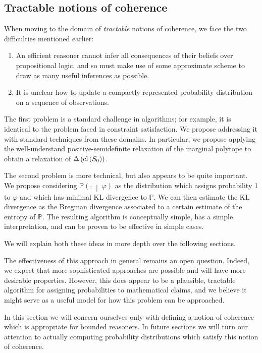\documentclass[12pt]{article}
\theoremstyle{definition}
\newcommand{\ofc}[2]{\left(#1\;\middle\vert\;#2\right)}
\newcommand{\PP}{\mathbb{P}}
\newcommand{\Pc}[2]{\PP\ofc{#1}{#2}}
\newcommand{\vp}{\varphi}
\begin{document}
\subsection{Tractable notions of coherence}

When moving to the domain of \emph{tractable} notions of coherence,
we face the two difficulties mentioned earlier:
\begin{enumerate}
\item An efficient reasoner cannot infer all consequences
of their beliefs over propositional logic,
and so must make use of some approximate scheme
to draw as many useful inferences as possible.
\item It is unclear how to update a compactly represented
probability distribution on a sequence of observations.
\end{enumerate}
The first problem is a standard challenge in algorithms;
for example, it
is identical to the problem faced in constraint satisfaction.
We propose addressing it with standard techniques
from these domains.
In particular, we propose applying the well-understand
positive-semidefinite relaxation of the marginal polytope
to obtain a relaxation of $\Delta\left(\text{cl}\left(S_0\right)\right)$.

The second problem is more technical, but also appears
to be quite important.
We propose considering
$\Pc{\cdot}{\vp}$ as the distribution which assigns
probability 1 to $\vp$ and which has minimal KL divergence
to $\PP$.
We can then estimate the KL divergence as the Bregman divergence
associated to a certain estimate of the entropy of $\PP$.
The resulting algorithm is conceptually simple, has a simple interpretation,
and can be proven to be effective in simple cases.

We will explain both these ideas in more depth over the following sections.

The effectiveness of this approach in general remains an open question.
Indeed, we expect that more sophisticated approaches are possible
and will have more desirable properties.
However, this does appear to be a plausible, tractable
algorithm for assigning probabilities to mathematical claims,
and we believe it might serve as a useful model for how this
problem can be approached.

In this section we will concern ourselves only with
defining a notion of coherence which is appropriate
for bounded reasoners.
In future sections we will turn our attention
to actually computing probability distributions which satisfy
this notion of coherence.
\end{document}
